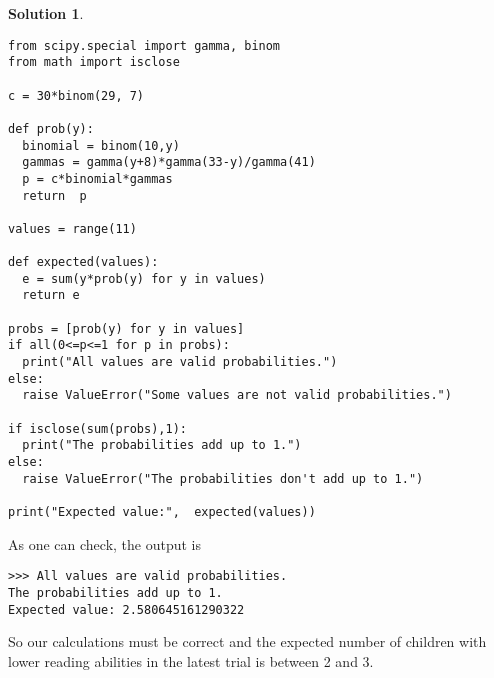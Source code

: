 \documentclass{article}
\theoremstyle{plain}
\theoremstyle{definition}
\newtheorem*{sol*}{Solution}
\begin{document}
\begin{sol*}
\lstset{language=Python,
showstringspaces=false,
tab=\rightarrowfill}
\begin{lstlisting}
from scipy.special import gamma, binom
from math import isclose

c = 30*binom(29, 7)

def prob(y):
  binomial = binom(10,y)
  gammas = gamma(y+8)*gamma(33-y)/gamma(41)
  p = c*binomial*gammas
  return  p 

values = range(11)

def expected(values):
  e = sum(y*prob(y) for y in values)
  return e

probs = [prob(y) for y in values]
if all(0<=p<=1 for p in probs):
  print("All values are valid probabilities.")
else:
  raise ValueError("Some values are not valid probabilities.")

if isclose(sum(probs),1):
  print("The probabilities add up to 1.")
else:
  raise ValueError("The probabilities don't add up to 1.")

print("Expected value:",  expected(values))
\end{lstlisting}

As one can check, the output is
\begin{verbatim}
>>> All values are valid probabilities.
The probabilities add up to 1.
Expected value: 2.580645161290322
\end{verbatim}
So our calculations must be correct and the expected number of children with lower reading abilities in the latest trial is between 2 and 3. 
\end{sol*}
\end{document}
